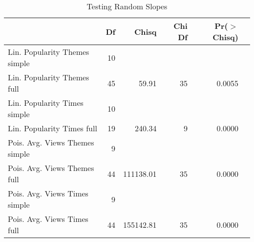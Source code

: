 \begin{table}[ht]
	   \caption{Testing Random Slopes} 
	\label{anova}
\centering
\begin{tabular}{lrrrrr}
  \hline
 & Df & Chisq & Chi Df & Pr($>$Chisq) \\ 
  \hline
Lin. Popularity Themes simple & 10 &  &  &  \\ 
Lin. Popularity Themes full & 45 & 59.91 & 35 & 0.0055 \\ 
Lin. Popularity Times simple & 10 &  &  &  \\ 
Lin. Popularity Times full & 19 & 240.34 & 9 & 0.0000 \\ 
Pois. Avg. Views Themes simple & 9 &  &  &  \\ 
Pois. Avg. Views Themes full & 44 & 111138.01 & 35 & 0.0000 \\ 
Pois. Avg. Views Times simple & 9 &  &  &  \\ 
Pois. Avg. Views Times full & 44 & 155142.81 & 35 & 0.0000 \\ 
   \hline

\end{tabular}
\end{table}
